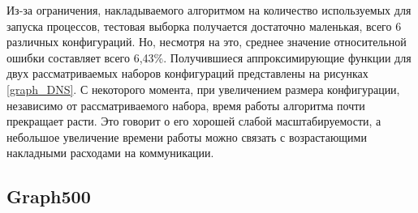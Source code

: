 			Из-за ограничения, накладываемого алгоритмом на количество используемых для запуска процессов, тестовая выборка получается достаточно маленькая, всего 6 различных конфигураций. Но, несмотря на это, среднее значение относительной ошибки составляет всего 6,43\%. Получившиеся аппроксимирующие функции для двух рассматриваемых наборов конфигураций представлены на рисунках \eqref{graph_DNS}. С некоторого момента, при увеличением размера конфигурации, независимо от рассматриваемого набора, время работы алгоритма почти прекращает расти. Это говорит о его хорошей слабой масштабируемости, а небольшое увеличение времени работы можно связать с возрастающими накладными расходами на коммуникации.

	\subsection{Graph500}
